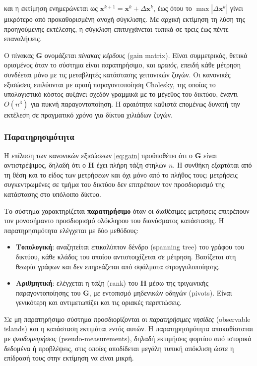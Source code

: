 και η εκτίμηση ενημερώνεται ως $\mathbf{x}^{k+1} = \mathbf{x}^{k} + \Delta \mathbf{x}^{k}$,
έως ότου το $\max|\Delta \mathbf{x}^{k}|$ γίνει μικρότερο από προκαθορισμένη ανοχή
σύγκλισης. Με αρχική εκτίμηση τη λύση της προηγούμενης εκτέλεσης, η σύγκλιση επιτυγχάνεται
τυπικά σε τρεις έως πέντε επαναλήψεις.

Ο πίνακας $\mathbf{G}$ ονομάζεται \emph{πίνακας κέρδους} (gain matrix). Είναι συμμετρικός,
θετικά ορισμένος όταν το σύστημα είναι παρατηρήσιμο, και \emph{αραιός}, επειδή κάθε μέτρηση
συνδέεται μόνο με τις μεταβλητές κατάστασης γειτονικών ζυγών. Οι κανονικές εξισώσεις
επιλύονται με αραιή παραγοντοποίηση Cholesky, της οποίας το υπολογιστικό κόστος αυξάνει
σχεδόν γραμμικά με το μέγεθος του δικτύου, έναντι $O(n^3)$ για πυκνή παραγοντοποίηση. Η
αραιότητα καθιστά επομένως δυνατή την εκτέλεση σε πραγματικό χρόνο για δίκτυα χιλιάδων
ζυγών.

\subsubsection*{Παρατηρησιμότητα}

Η επίλυση των κανονικών εξισώσεων \eqref{eq:gain} προϋποθέτει ότι ο $\mathbf{G}$ είναι
αντιστρέψιμος,
δηλαδή ότι ο $\mathbf{H}$ έχει πλήρη τάξη στηλών $n$. Η συνθήκη εξαρτάται από τη θέση και το
είδος των μετρήσεων και όχι μόνο από το πλήθος τους: μετρήσεις συγκεντρωμένες σε τμήμα του
δικτύου δεν επιτρέπουν τον προσδιορισμό της κατάστασης στο υπόλοιπο δίκτυο.

Το σύστημα χαρακτηρίζεται \textbf{παρατηρήσιμο} όταν οι διαθέσιμες μετρήσεις επιτρέπουν τον
μονοσήμαντο προσδιορισμό ολόκληρου του διανύσματος κατάστασης. Η παρατηρησιμότητα ελέγχεται
με δύο μεθόδους:

\begin{itemize}
\item \textbf{Τοπολογική}: αναζητείται επικαλύπτον δένδρο (spanning tree) του γράφου του
      δικτύου, κάθε κλάδος του οποίου αντιστοιχίζεται σε μέτρηση. Βασίζεται στη θεωρία
      γράφων και δεν επηρεάζεται από σφάλματα στρογγυλοποίησης.
\item \textbf{Αριθμητική}: ελέγχεται η τάξη (rank) του $\mathbf{H}$ μέσω της τριγωνικής
      παραγοντοποίησης του $\mathbf{G}$, με εντοπισμό μηδενικών οδηγών (pivots). Είναι
      γενικότερη και αντιμετωπίζει και τις οριακές περιπτώσεις.
\end{itemize}

Σε μη παρατηρήσιμο σύστημα προσδιορίζονται οι \emph{παρατηρήσιμες νησίδες} (observable
islands) και η κατάσταση εκτιμάται εντός αυτών. Η παρατηρησιμότητα αποκαθίσταται με
\emph{ψευδομετρήσεις} (pseudo-measurements), δηλαδή εκτιμήσεις φορτίου από ιστορικά δεδομένα
ή προβλέψεις, στις οποίες αποδίδεται μεγάλη τυπική απόκλιση ώστε η επίδρασή τους στην
εκτίμηση να είναι μικρή.

